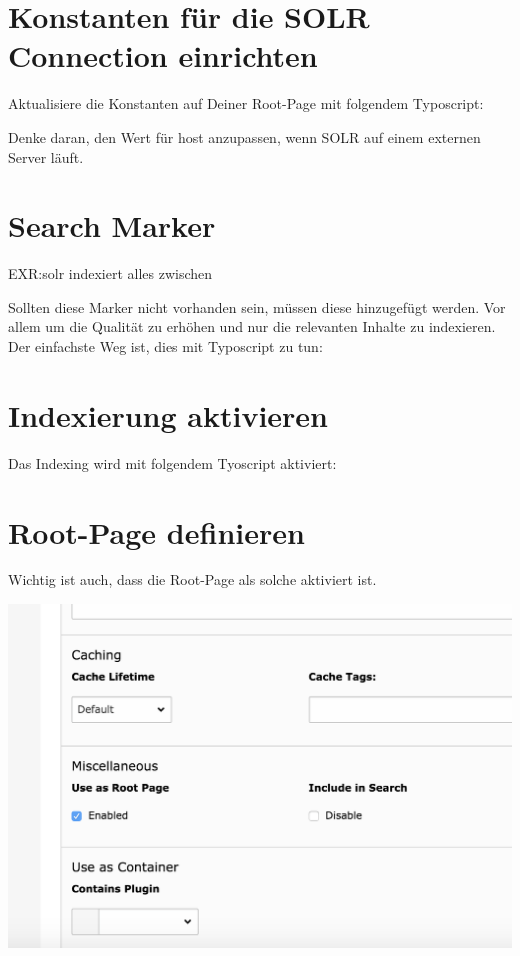 \documentclass[]{book}
\begin{document}
\section{Konstanten für die SOLR Connection einrichten}

Aktualisiere die Konstanten auf Deiner Root-Page mit folgendem
Typoscript:

Denke daran, den Wert für host anzupassen, wenn SOLR auf einem externen
Server läuft.

\section{Search Marker}

EXR:solr indexiert alles zwischen

Sollten diese Marker nicht vorhanden sein, müssen diese hinzugefügt
werden. Vor allem um die Qualität zu erhöhen und nur die relevanten
Inhalte zu indexieren. Der einfachste Weg ist, dies mit Typoscript zu
tun:

\section{Indexierung aktivieren}

Das Indexing wird mit folgendem Tyoscript aktiviert:

\section{Root-Page definieren}

Wichtig ist auch, dass die Root-Page als solche aktiviert ist.

\includegraphics{images/root_page.png}
\end{document}
